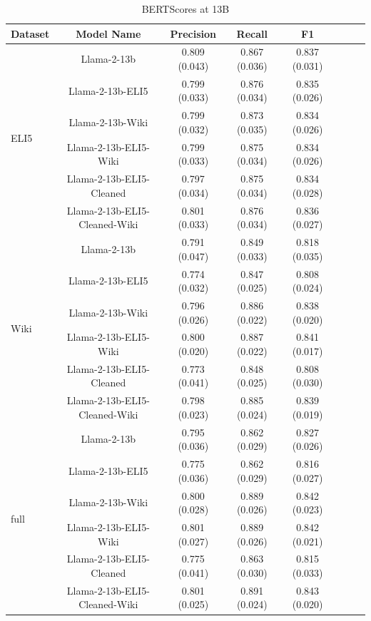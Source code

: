 \documentclass[11pt, oneside]{article}   	%
\begin{document}
\begin{table}[ht]
\centering
\begin{tabular}{lccccccc}
\toprule
Dataset& Model Name  & Precision & Recall & F1 \\
\midrule
\multirow{6}{*}{ELI5} & Llama-2-13b & 0.809 (0.043) & 0.867 (0.036) & 0.837 (0.031) \\
& Llama-2-13b-ELI5 & 0.799 (0.033) & 0.876 (0.034) & 0.835 (0.026) \\
& Llama-2-13b-Wiki & 0.799 (0.032) & 0.873 (0.035) & 0.834 (0.026) \\
& Llama-2-13b-ELI5-Wiki & 0.799 (0.033) & 0.875 (0.034) & 0.834 (0.026) \\
& Llama-2-13b-ELI5-Cleaned & 0.797 (0.034) & 0.875 (0.034) & 0.834 (0.028) \\
& Llama-2-13b-ELI5-Cleaned-Wiki & 0.801 (0.033) & 0.876 (0.034) & 0.836 (0.027) \\
\midrule
\multirow{6}{*}{Wiki} & Llama-2-13b & 0.791 (0.047) & 0.849 (0.033) & 0.818 (0.035) \\
& Llama-2-13b-ELI5 & 0.774 (0.032) & 0.847 (0.025) & 0.808 (0.024) \\
& Llama-2-13b-Wiki & 0.796 (0.026) & 0.886 (0.022) & 0.838 (0.020) \\
& Llama-2-13b-ELI5-Wiki & 0.800 (0.020) & 0.887 (0.022) & 0.841 (0.017) \\
& Llama-2-13b-ELI5-Cleaned & 0.773 (0.041) & 0.848 (0.025) & 0.808 (0.030) \\
& Llama-2-13b-ELI5-Cleaned-Wiki & 0.798 (0.023) & 0.885 (0.024) & 0.839 (0.019) \\
\midrule
\multirow{6}{*}{full} & Llama-2-13b & 0.795 (0.036) & 0.862 (0.029) & 0.827 (0.026) \\
& Llama-2-13b-ELI5 & 0.775 (0.036) & 0.862 (0.029) & 0.816 (0.027) \\
& Llama-2-13b-Wiki & 0.800 (0.028) & 0.889 (0.026) & 0.842 (0.023) \\
& Llama-2-13b-ELI5-Wiki & 0.801 (0.027) & 0.889 (0.026) & 0.842 (0.021) \\
& Llama-2-13b-ELI5-Cleaned & 0.775 (0.041) & 0.863 (0.030) & 0.815 (0.033) \\
& Llama-2-13b-ELI5-Cleaned-Wiki & 0.801 (0.025) & 0.891 (0.024) & 0.843 (0.020) \\
\bottomrule
\end{tabular}
\caption{BERTScores at 13B}
\label{tab:bertscores_13B}
\end{table}
\end{document}
